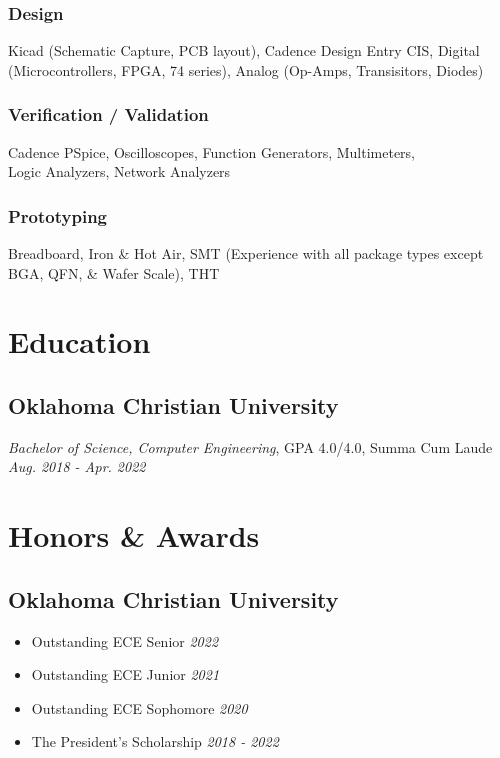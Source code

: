 \documentclass{article}
\begin{document}
\begin{spacing}{.5}
		\subsubsection{Design} \large{ Kicad} \small{(Schematic Capture, PCB layout),} \large{Cadence Design Entry CIS, Digital} \small{(Microcontrollers, FPGA, 74 series),} \hspace*{.45cm}  \large{ Analog} \small{(Op-Amps, Transisitors, Diodes)}
		\subsubsection{Verification / Validation} \large{ Cadence PSpice, Oscilloscopes, Function Generators, Multimeters,\\ \hspace*{.45cm} Logic Analyzers, Network Analyzers}
		\subsubsection{Prototyping} \large{ Breadboard, Iron \& Hot Air, SMT} \small{(Experience with all package types except BGA, QFN, \& Wafer Scale),} \large{ \hspace*{.45cm} THT}

\section{Education}
	\subsection{Oklahoma Christian University}
		\hspace*{.35cm} \textit{Bachelor of Science, Computer Engineering}, GPA 4.0/4.0, Summa Cum Laude \hfill \small{\textsl{Aug. 2018 - Apr. 2022}}

\section{Honors \& Awards}
	\subsection{Oklahoma Christian University}
		\begin{itemize}[label=$\bullet$,itemsep=-.35ex]
			\item \large{Outstanding ECE Senior} \hfill \small{\textsl{2022}}
			\item \large{Outstanding ECE Junior} \hfill \small{\textsl{2021}}
			\item \large{Outstanding ECE Sophomore} \hfill \small{\textsl{2020}}
			\item \large{The President's Scholarship} \hfill \small{\textsl{2018 - 2022}}
		\end{itemize}

\end{spacing}
\end{document}
